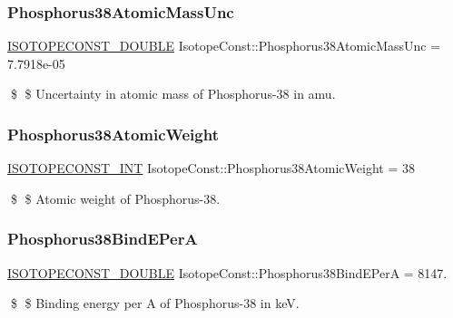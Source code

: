 \subsubsection{\texorpdfstring{Phosphorus38\+Atomic\+Mass\+Unc}{Phosphorus38AtomicMassUnc}}
{\footnotesize\ttfamily \mbox{\hyperlink{group___isotope_const-_macros_ga8f45a7272ce02c0b4c65c44636ed719a}{I\+S\+O\+T\+O\+P\+E\+C\+O\+N\+S\+T\+\_\+\+D\+O\+U\+B\+LE}} Isotope\+Const\+::\+Phosphorus38\+Atomic\+Mass\+Unc = 7.\+7918e-\/05}

\$ \$ Uncertainty in atomic mass of Phosphorus-\/38 in amu. \mbox{\label{group___isotope_const-_phosphorus-_p38_ga13af497e73ade0d3f003c02352868ffc}} 
\subsubsection{\texorpdfstring{Phosphorus38\+Atomic\+Weight}{Phosphorus38AtomicWeight}}
{\footnotesize\ttfamily \mbox{\hyperlink{group___isotope_const-_macros_ga5f18360b3e99483a35c32d789e62621c}{I\+S\+O\+T\+O\+P\+E\+C\+O\+N\+S\+T\+\_\+\+I\+NT}} Isotope\+Const\+::\+Phosphorus38\+Atomic\+Weight = 38}

\$ \$ Atomic weight of Phosphorus-\/38. \mbox{\label{group___isotope_const-_phosphorus-_p38_gaf0aa5f33be39b2b4f0fcadb6d2c90326}} 
\subsubsection{\texorpdfstring{Phosphorus38\+Bind\+E\+PerA}{Phosphorus38BindEPerA}}
{\footnotesize\ttfamily \mbox{\hyperlink{group___isotope_const-_macros_ga8f45a7272ce02c0b4c65c44636ed719a}{I\+S\+O\+T\+O\+P\+E\+C\+O\+N\+S\+T\+\_\+\+D\+O\+U\+B\+LE}} Isotope\+Const\+::\+Phosphorus38\+Bind\+E\+PerA = 8147.}

\$ \$ Binding energy per A of Phosphorus-\/38 in keV. \mbox{\label{group___isotope_const-_phosphorus-_p38_ga1e56cc3b4659a030aa91b6d56e541f2d}} 
